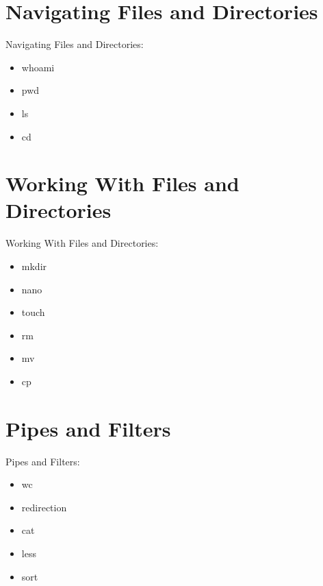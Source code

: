\documentclass[
 size=12pt,
 paper=screen,
 mode=present,
 display=slidesnotes,
 style=paintings,
 nohandoutpagebreaks,
]{powerdot}
\begin{document}
\section[slide=false]{Navigating Files and Directories}

\begin{slide}{Navigating Files and Directories:}
  \begin{itemize}
     \item whoami
     \item pwd
     \item ls
     \item cd
  \end{itemize}
\end{slide}

\section[slide=false]{Working With Files and Directories}

\begin{slide}{Working With Files and Directories:}
  \begin{itemize}
     \item mkdir
     \item nano
     \item touch
     \item rm
     \item mv
     \item cp
  \end{itemize}
\end{slide}

\section[slide=false]{Pipes and Filters}

\begin{slide}{Pipes and Filters:}
  \begin{itemize}
     \item wc
     \item redirection
     \item cat
     \item less
     \item sort
  \end{itemize}
\end{slide}
\end{document}
